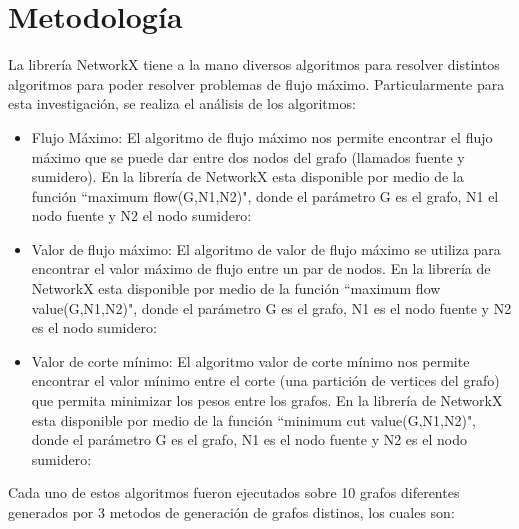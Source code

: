\documentclass{article}
\begin{document}
\section{Metodología}
La librería NetworkX tiene a la mano diversos algoritmos para resolver distintos algoritmos para poder resolver problemas de flujo máximo. Particularmente para esta investigación, se realiza el análisis de los algoritmos:
\begin{itemize}
\item{Flujo Máximo}: El algoritmo de flujo máximo nos permite encontrar el flujo máximo que se puede dar entre dos nodos del grafo (llamados fuente y sumidero). En la librería de NetworkX esta disponible por medio de  la función ``maximum flow(G,N1,N2)", donde el parámetro G es el grafo, N1 el nodo fuente y N2 el nodo sumidero:

\item{Valor de flujo máximo}:  El algoritmo de valor de flujo máximo se utiliza para encontrar el valor máximo de flujo entre un par de nodos. En la librería de NetworkX esta disponible por medio de  la función ``maximum flow value(G,N1,N2)", donde el parámetro G es el grafo, N1 es el nodo fuente y N2 es el nodo sumidero:

\item{Valor de corte mínimo}: El algoritmo valor de corte mínimo nos permite encontrar el valor mínimo entre el corte (una partición de vertices del grafo) que permita minimizar los pesos entre los grafos. En la librería de NetworkX esta disponible por medio de  la función ``minimum cut value(G,N1,N2)", donde el parámetro G es el grafo, N1 es el nodo fuente y N2 es el nodo sumidero:

\end{itemize}
Cada uno de estos algoritmos fueron ejecutados sobre 10 grafos diferentes generados por 3 metodos de generación de grafos distinos, los cuales son:
\end{document}
